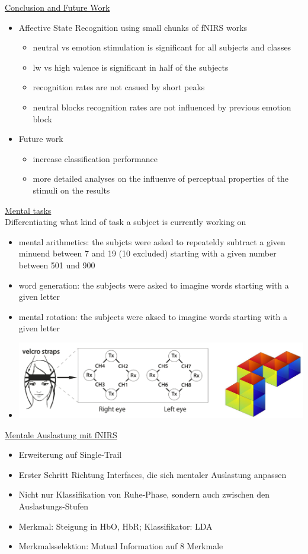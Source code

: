\documentclass[a4paper,10pt,oneside]{article}
\begin{document}
\underline{Conclusion and Future Work} \\
	\begin{itemize}
		\item Affective State Recognition using small chunks of fNIRS works
			\begin{itemize}
				\item neutral vs emotion stimulation is significant for all subjects and classes 
				\item lw vs high valence is significant in half of the subjects
				\item recognition rates are not casued by short peaks
				\item neutral blocks recognition rates are not influenced by previous emotion block
			\end{itemize}
		\item Future work
			\begin{itemize}
				\item increase classification performance 
				\item more detailed analyses on the influenve of perceptual properties of the stimuli on the results
			\end{itemize}
	\end{itemize}
	

\underline{Mental tasks} \\
Differentiating what kind of task a subject is currently working on
	\begin{itemize}
		\item mental arithmetics: the subjcts were asked to repeateldy subtract a given minuend between 7 and 19 (10 excluded) starting with a given number between 501 und 900
		\item word generation: the subjects were asked to imagine words starting with a given letter
		\item mental rotation: the subjects were aksed to imagine words starting with a given letter
		\item[] \includegraphics[scale=0.2]{Grafiken/2137.png}
	\end{itemize}


\underline{Mentale Auslastung mit fNIRS} \\
	\begin{itemize}
		\item Erweiterung auf Single-Trail
		\item Erster Schritt Richtung Interfaces, die sich mentaler Auslastung anpassen
		\item Nicht nur Klassifikation von Ruhe-Phase, sondern auch zwischen den Auslastungs-Stufen
		\item Merkmal: Steigung in HbO, HbR; Klassifikator: LDA
		\item Merkmalsselektion: Mutual Information auf 8 Merkmale
	\end{itemize}
	
\end{document}
